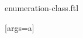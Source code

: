\documentclass{stex}
\begin{document}
\begin{smodule}{enumeration-class.ftl}

[args=a]{}

\end{smodule}
\end{document}
